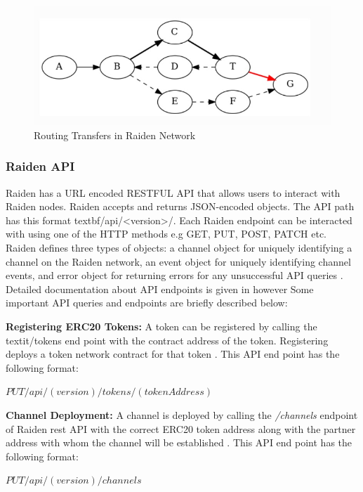 \begin{figure}[h]
	\centering
    \includegraphics[width=120mm,scale=1]{figs/TransferRouting}
	\caption{Routing Transfers in Raiden Network \cite{rad:001}}
	\label{fig:TR}
\end{figure}


\subsubsection{Raiden API}	\label{R-API}	
Raiden has a URL encoded RESTFUL API that allows users to interact with Raiden nodes. Raiden accepts and returns JSON-encoded objects. The API path has this format textbf{/api/<version>/}. Each Raiden endpoint can be interacted with using one of the HTTP methods e.g GET, PUT, POST, PATCH etc. Raiden defines three types of objects: a channel object for uniquely identifying a channel on the Raiden network, an event object for uniquely identifying channel events, and error object for returning errors for any unsuccessful API queries \cite{rad:001}. Detailed documentation about API endpoints is given in \cite{rad:001} however Some important API queries and endpoints are briefly described below:

\textbf{Registering ERC20 Tokens:} A token can be registered by calling the textit{/tokens} end point with the contract address of the token. Registering deploys a token network contract for that token \cite{rad:001}. This API end point has the following format: 

\textbf{$PUT /api/(version)/tokens/(tokenAddress)$} \cite{rad:001}

\textbf{Channel Deployment:} A channel is deployed by calling the \textit{/channels} endpoint of Raiden rest API with the correct ERC20 token address along with the partner address with whom the channel will be established \cite{rad:001}. This API end point has the following format: 

\textbf{$PUT /api/(version)/channels$} \cite{rad:001}

